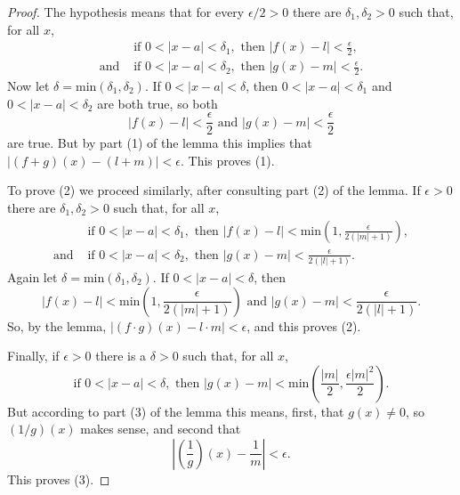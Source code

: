 \documentclass{article}
\begin{document}
\begin{proof}
  The hypothesis means that for every $\epsilon/2 > 0$ there are $\delta_1,
  \delta_2 > 0$ such that, for all $x$, \begin{align*}
    &\text{if } 0 < |x - a| < \delta_1, \text{ then } |f(x) - l| <
      \frac{\epsilon}{2}, \\
    \text{and } &\text{if } 0 < |x - a| < \delta_2, \text{ then } |g(x) - m| <
      \frac{\epsilon}{2}.
  \end{align*} Now let $\delta = \mathrm{min}(\delta_1, \delta_2)$. If $0 < |x
  - a| < \delta$, then $0 < |x - a| < \delta_1$ and $0 < |x - a| < \delta_2$
  are both true, so both \begin{equation*}
    |f(x) - l| < \frac{\epsilon}{2} \text{ and } |g(x) - m| <
      \frac{\epsilon}{2}
  \end{equation*} are true. But by part (1) of the lemma this implies that $|(f
  + g)(x) - (l + m)| < \epsilon$. This proves (1).

  To prove (2) we proceed similarly, after consulting part (2) of the lemma. If
  $\epsilon > 0$ there are $\delta_1, \delta_2 > 0$ such that, for all $x$,
  \begin{align*}
    &\text{if } 0 < |x - a| < \delta_1, \text{ then } |f(x) - l| < 
      \mathrm{min}\left(1, \frac{\epsilon}{2(|m| + 1)}\right), \\
    \text{and } &\text{if } 0 < |x - a| < \delta_2, \text{ then } |g(x) - m| <
      \frac{\epsilon}{2(|l| + 1)}.
  \end{align*} Again let $\delta = \mathrm{min}(\delta_1, \delta_2)$. If $0 <
  |x - a| < \delta$, then \begin{equation*}
    |f(x) - l| < \mathrm{min}\left(1, \frac{\epsilon}{2(|m| + 1)}\right)
      \text{ and } |g(x) - m| < \frac{\epsilon}{2(|l| + 1)}.
  \end{equation*} So, by the lemma, $|(f \cdot g)(x) - l \cdot m| < \epsilon$,
  and this proves (2).

  Finally, if $\epsilon > 0$ there is a $\delta > 0$ such that, for all $x$,
  \begin{equation*}
    \text{if } 0 < |x - a| < \delta, \text{ then } |g(x) - m| <
      \mathrm{min}\left(\frac{|m|}{2}, \frac{\epsilon|m|^2}{2}\right).
  \end{equation*} But according to part (3) of the lemma this means, first,
  that $g(x) \neq 0$, so $(1/g)(x)$ makes sense, and second that
  \begin{equation*}
    \left|\left(\frac{1}{g}\right)(x) - \frac{1}{m}\right| < \epsilon.
  \end{equation*} This proves (3).
\end{proof}
\end{document}
